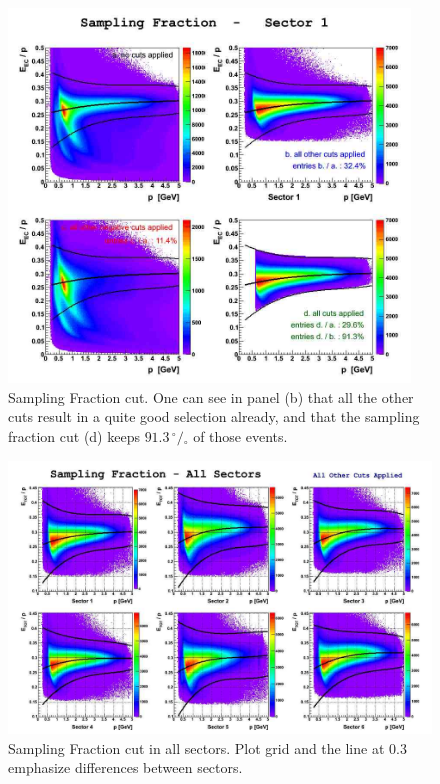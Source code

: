 \begin{figure}[t]
  \centering
		\includegraphics[width=0.95\textwidth]{img/sampling_sect1.jpg}
		\caption{Sampling Fraction cut. One can see in panel (b) that all the other cuts 
		result in a quite good selection already, and that the sampling fraction cut (d) keeps  
		$91.3\,^{\circ\!\!}/\!_\circ$ of those events.}
 		\label{fig:sampling_fractioncut_s1}
\end{figure}

\clearpage\newpage
\begin{figure}[t]
  \centering
		\includegraphics[width=1.0\textwidth]{img/ecp_all_sectors.jpg}
		\caption{Sampling Fraction cut in all sectors. Plot grid and 
					the line at 0.3 emphasize differences between sectors.}
 		\label{fig:ecp_all_sectors}
\end{figure}

